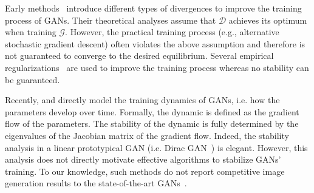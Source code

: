 \documentclass{article}
\newcommand{\xG}{\mathcal{G}}
\newcommand{\xD}{\mathcal{D}}
\theoremstyle{definition}
\begin{document}
Early methods~\citep{mao2017least,gulrajani2017improved, arjovsky2017wasserstein,du2018learning} introduce different types of divergences to improve the training process of GANs. Their theoretical analyses assume that $\xD$ achieves its optimum when training $\xG$.
However, the practical training process (e.g., alternative stochastic gradient descent) often violates the above assumption and therefore is not guaranteed to converge to the desired equilibrium. Several empirical regularizations~\cite{miyato2018spectral,gulrajani2017improved,zhang2019consistency} are used to improve the training process whereas no stability can be guaranteed.

Recently, \citet{mescheder2017numerics} and \citet{nagarajan2017gradient} directly model the training dynamics of GANs, i.e. how the parameters develop over time. 
Formally, the dynamic is defined as the gradient flow of the parameters.
The stability of the dynamic is fully determined by the eigenvalues of the Jacobian matrix of the gradient flow.
Indeed, the stability analysis in a linear prototypical GAN (i.e. Dirac GAN~\cite{mescheder2018training}) is elegant. 
However, this analysis does not directly motivate effective algorithms to stabilize GANs' training.
To our knowledge, such methods do not report competitive image generation results to the state-of-the-art GANs~\cite{miyato2018spectral}.
\end{document}
